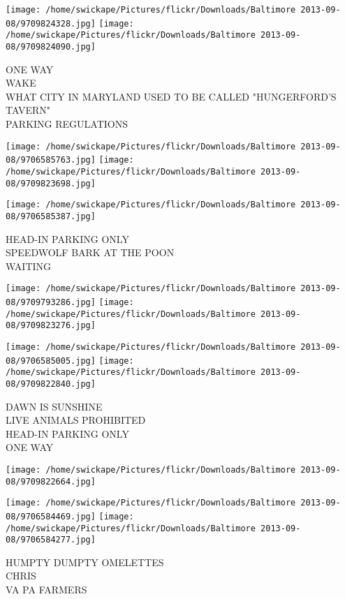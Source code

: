 \documentclass[10pt,letterpaper]{article}
\begin{document}
\texttt{[image: /home/swickape/Pictures/flickr/Downloads/Baltimore 2013-09-08/9709824328.jpg]}
\texttt{[image: /home/swickape/Pictures/flickr/Downloads/Baltimore 2013-09-08/9709824090.jpg]}

ONE WAY\\
WAKE\\
WHAT CITY IN MARYLAND USED TO BE CALLED "HUNGERFORD'S TAVERN"\\
PARKING REGULATIONS\\
\pagebreak

\texttt{[image: /home/swickape/Pictures/flickr/Downloads/Baltimore 2013-09-08/9706585763.jpg]}
\texttt{[image: /home/swickape/Pictures/flickr/Downloads/Baltimore 2013-09-08/9709823698.jpg]}

\vspace{0.25in}
\texttt{[image: /home/swickape/Pictures/flickr/Downloads/Baltimore 2013-09-08/9706585387.jpg]}

HEAD{-}IN PARKING ONLY\\
SPEEDWOLF BARK AT THE POON\\
WAITING\\
\pagebreak

\texttt{[image: /home/swickape/Pictures/flickr/Downloads/Baltimore 2013-09-08/9709793286.jpg]}
\texttt{[image: /home/swickape/Pictures/flickr/Downloads/Baltimore 2013-09-08/9709823276.jpg]}

\texttt{[image: /home/swickape/Pictures/flickr/Downloads/Baltimore 2013-09-08/9706585005.jpg]}
\texttt{[image: /home/swickape/Pictures/flickr/Downloads/Baltimore 2013-09-08/9709822840.jpg]}

DAWN IS SUNSHINE\\
LIVE ANIMALS PROHIBITED\\
HEAD{-}IN PARKING ONLY\\
ONE WAY\\
\pagebreak

\texttt{[image: /home/swickape/Pictures/flickr/Downloads/Baltimore 2013-09-08/9709822664.jpg]}

\vspace{0.25in}
\texttt{[image: /home/swickape/Pictures/flickr/Downloads/Baltimore 2013-09-08/9706584469.jpg]}
\texttt{[image: /home/swickape/Pictures/flickr/Downloads/Baltimore 2013-09-08/9706584277.jpg]}

HUMPTY DUMPTY OMELETTES\\
CHRIS\\
VA PA FARMERS\\
\pagebreak
\end{document}
